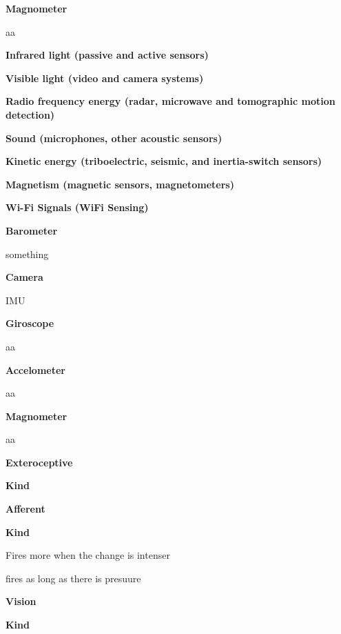 \documentclass{book}
\providecommand{\ProjectDeepHeading}[2]{%
    \par\medskip\noindent\textbf{#2}\par\smallskip
}
\begin{document}
        \ProjectDeepHeading{10}{Magnometer}
            aa
    
    \ProjectDeepHeading{9}{Infrared light (passive and active sensors)}
    
    \ProjectDeepHeading{9}{Visible light (video and camera systems)}
    
    \ProjectDeepHeading{9}{Radio frequency energy (radar, microwave and tomographic motion detection)}
    
    \ProjectDeepHeading{9}{Sound (microphones, other acoustic sensors)}
    
    \ProjectDeepHeading{9}{Kinetic energy (triboelectric, seismic, and inertia-switch sensors)}
    
    \ProjectDeepHeading{9}{Magnetism (magnetic sensors, magnetometers)}
    
    \ProjectDeepHeading{9}{Wi-Fi Signals (WiFi Sensing)}
    
    
    \ProjectDeepHeading{8}{Barometer}
    something
    
    \ProjectDeepHeading{8}{Camera}


IMU
    
    \ProjectDeepHeading{9}{Giroscope}
        aa
    
    \ProjectDeepHeading{9}{Accelometer}
        aa
    
    \ProjectDeepHeading{9}{Magnometer}
        aa

\ProjectDeepHeading{6}{Exteroceptive}

\ProjectDeepHeading{7}{Kind}

\ProjectDeepHeading{8}{Afferent}

\ProjectDeepHeading{9}{Kind}


Fires more when the change is intenser


fires as long as there is presuure

\ProjectDeepHeading{8}{Vision}

\ProjectDeepHeading{9}{Kind}
\end{document}
